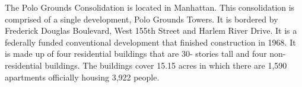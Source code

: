The Polo Grounds Consolidation is located in Manhattan. This consolidation is comprised of a single development, Polo Grounds Towers. It is bordered by Frederick Douglas Boulevard, West 155th Street and Harlem River Drive. It is a federally funded conventional development that finished construction in 1968. It is made up of four residential buildings that are 30- stories tall and four non-residential buildings. The buildings cover 15.15 acres in which there are 1,590 apartments officially housing 3,922 people.